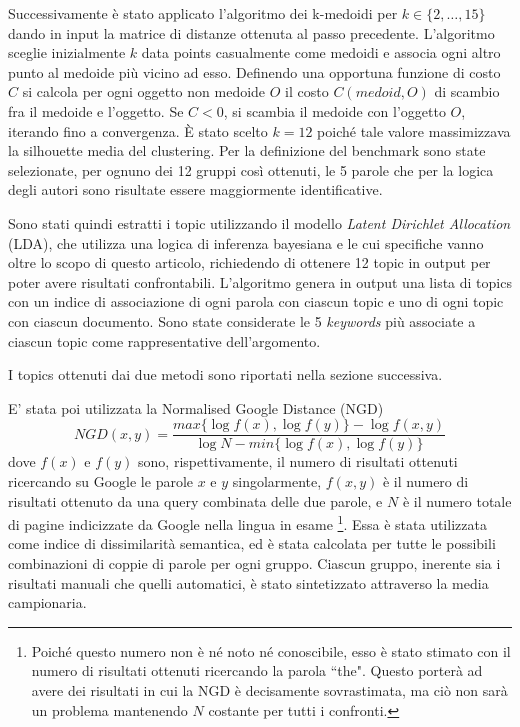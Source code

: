 \documentclass[]{article}
\begin{document}
Successivamente è stato applicato l'algoritmo dei k-medoidi per $k \in \{2, \dots, 15\}$ dando in input la matrice di distanze ottenuta al passo precedente. L'algoritmo sceglie inizialmente $k$ data points casualmente come medoidi e associa ogni altro punto al medoide più vicino ad esso.
Definendo una opportuna funzione di costo $C$ si calcola per ogni oggetto non medoide $O$ il costo $C(medoid, O)$ di scambio fra il medoide e l'oggetto.  Se $C<0$, si scambia il medoide con l'oggetto $O$, iterando fino a convergenza.
\newline
È stato scelto $k=12$ poiché tale valore massimizzava la silhouette media del clustering.
\newline
Per la definizione del benchmark sono state selezionate, per ognuno dei 12 gruppi così ottenuti, le 5 parole che per la logica degli autori sono risultate essere maggiormente identificative.


Sono stati quindi estratti i topic utilizzando il modello \textit{Latent Dirichlet Allocation} (LDA), che utilizza una logica di inferenza bayesiana \cite{survey} e le cui specifiche vanno oltre lo scopo di questo articolo, richiedendo di ottenere 12 topic in output per poter avere risultati confrontabili.
L'algoritmo genera in output una lista di topics con un indice di associazione di ogni parola con ciascun topic e uno di ogni topic con ciascun documento.
Sono state considerate le 5 \textit{keywords} più associate a ciascun topic come rappresentative dell'argomento.


I topics ottenuti dai due metodi sono riportati nella sezione successiva.


E' stata poi utilizzata la Normalised Google Distance (NGD) \cite{NGD} \[NGD(x,y)=\frac{max\{\log f(x),\log f(y)\}-\log f(x,y)}{\log N-min\{\log f(x),\log f(y)\}} \]
dove $f(x)$ e $f(y)$ sono, rispettivamente, il numero di risultati ottenuti ricercando su Google le parole $x$ e $y$ singolarmente, $f(x,y)$ è il numero di risultati ottenuto da una query combinata delle due parole, e $N$ è il numero totale di pagine indicizzate da Google nella lingua in esame \footnote{Poiché questo numero non è né noto né conoscibile, esso è stato stimato con il numero di risultati ottenuti ricercando la parola ``the". Questo porterà ad avere dei risultati in cui la NGD è decisamente sovrastimata, ma ciò non sarà un problema mantenendo $N$ costante per tutti i confronti.}.
Essa \`e stata utilizzata come indice di dissimilarità semantica, ed è stata calcolata per tutte le possibili combinazioni di coppie di parole per ogni gruppo.  Ciascun gruppo, inerente sia i risultati manuali che quelli automatici, \`e stato sintetizzato attraverso la media campionaria.
\end{document}

